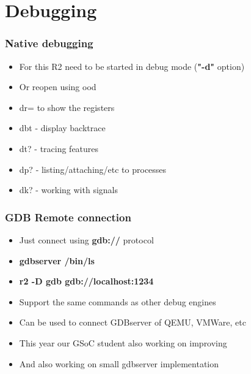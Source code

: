 \documentclass[10pt,pdf,utf8,english,compress,hyperref={unicode}]{beamer}
\begin{document}
\section{Debugging}

\begin{frame}[fragile]
  \frametitle{Native debugging}
  \begin{itemize}
	  \item For this R2 need to be started in debug mode (\textbf{"-d"} option)
	  \item Or reopen using \alert{ood}
	  \item \alert{dr=} to show the registers
	  \item \alert{dbt} - display backtrace
	  \item \alert{dt?} - tracing features
	  \item \alert{dp?} - listing/attaching/etc to processes
	  \item \alert{dk?} - working with signals
  \end{itemize}
\end{frame}


\begin{frame}[fragile]
\frametitle{GDB Remote connection}
\begin{itemize}
	\item Just connect using \textbf{gdb://} protocol
	\item \textbf{gdbserver /bin/ls}
	\item \textbf{r2 -D gdb gdb://localhost:1234}
	\item Support the same commands as other debug engines
	\item Can be used to connect GDBserver of QEMU, VMWare, etc
	\item This year our GSoC student also working on improving
	\item And also working on small gdbserver implementation
\end{itemize}
\end{frame}
\end{document}
